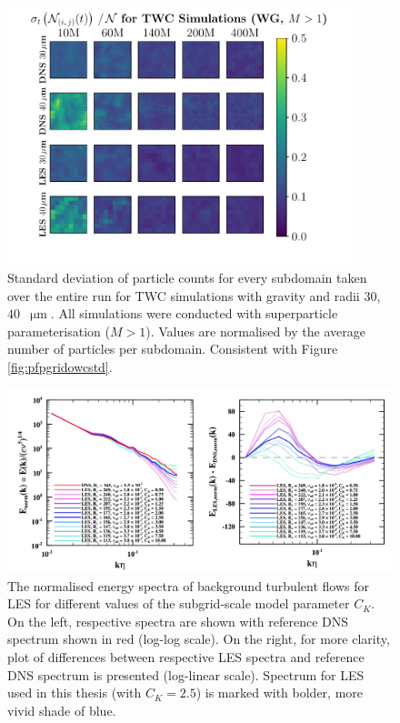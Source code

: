 
\begin{figure}
\centering
\includegraphics[width=10cm]{figures/3-24_pfpgridrdfstd.pdf}
\caption{
Standard deviation of particle counts for every subdomain taken over the entire run for TWC simulations with gravity and radii $30$, $40$~$\upmu\text{m}$.
All simulations were conducted with superparticle parameterisation ($M>1$). 
Values are normalised by the average number of particles per subdomain.
Consistent with Figure \ref{fig:pfpgridowcstd}.
}
\label{fig:pfpgridrdfstd}
\end{figure}

 



\begin{figure}
\centering
\includegraphics[width=13.5cm]{figures/B-01_sgsspec.pdf}
\caption{
The normalised energy spectra of background turbulent flows for LES for different values of the subgrid-scale model parameter $C_K$. 
On the left, respective spectra are shown with reference DNS spectrum shown in red (log-log scale).
On the right, for more clarity, plot of differences between respective LES spectra and reference DNS spectrum is presented (log-linear scale).
Spectrum for LES used in this thesis (with $C_K=2.5$) is marked with bolder, more vivid shade of blue.
}
\label{fig:sgsspec}
\end{figure}